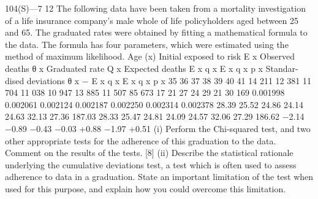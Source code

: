 104(S)—7
12
The following data have been taken from a mortality investigation of a life
insurance company’s male whole of life policyholders aged between 25 and 65.
The graduated rates were obtained by fitting a mathematical formula to the
data. The formula has four parameters, which were estimated using the method
of maximum likelihood.
Age
(x)
Initial
exposed
to risk
E x
Observed
deaths
θ x
Graduated
rate
Q x
Expected
deaths
E x q x
E x q x p x
Standar-
dised
deviations
θ x − E x q x
E x q x p x
35
36
37
38
39
40
41
14 211
12 381
11 704
11 038
10 947
13 885
11 507
85 673
17
21
27
24
29
21
30
169
0.001998
0.002061
0.002124
0.002187
0.002250
0.002314
0.002378
28.39
25.52
24.86
24.14
24.63
32.13
27.36
187.03
28.33
25.47
24.81
24.09
24.57
32.06
27.29
186.62
−2.14
−0.89
−0.43
−0.03
+0.88
−1.97
+0.51
(i) Perform the Chi-squared test, and two other appropriate tests for the
adherence of this graduation to the data. Comment on the results of the
tests.
[8]
(ii) Describe the statistical rationale underlying the cumulative deviations
test, a test which is often used to assess adherence to data in a
graduation. State an important limitation of the test when used for this
purpose, and explain how you could overcome this limitation.

